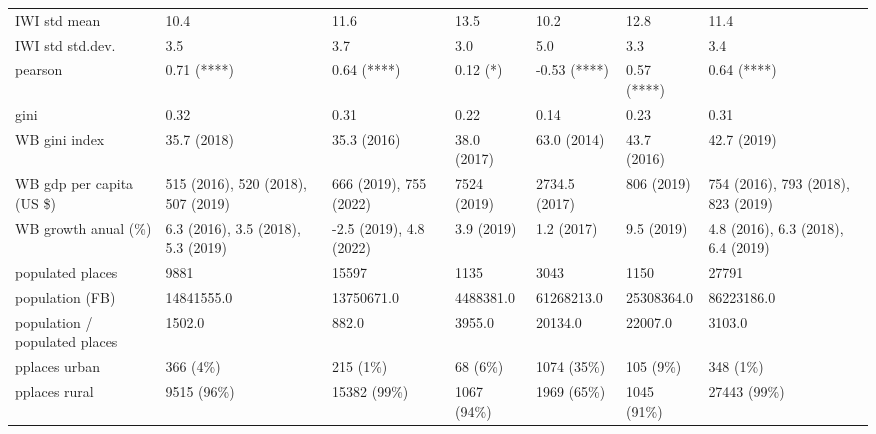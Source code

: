 \begin{tabular}{lllllll}
IWI std mean                  &                                10.4 &                     11.6 &         13.5 &           10.2 &         12.8 &                                11.4 \\
IWI std std.dev.              &                                 3.5 &                      3.7 &          3.0 &            5.0 &          3.3 &                                 3.4 \\
pearson                       &                         0.71 (****) &              0.64 (****) &     0.12 (*) &   -0.53 (****) &  0.57 (****) &                         0.64 (****) \\
gini                          &                                0.32 &                     0.31 &         0.22 &           0.14 &         0.23 &                                0.31 \\
WB gini index                 &                         35.7 (2018) &              35.3 (2016) &  38.0 (2017) &    63.0 (2014) &  43.7 (2016) &                         42.7 (2019) \\
WB gdp per capita (US \$)      &  515 (2016), 520 (2018), 507 (2019) &   666 (2019), 755 (2022) &  7524 (2019) &  2734.5 (2017) &   806 (2019) &  754 (2016), 793 (2018), 823 (2019) \\
WB growth anual (\%)           &  6.3 (2016), 3.5 (2018), 5.3 (2019) &  -2.5 (2019), 4.8 (2022) &   3.9 (2019) &     1.2 (2017) &   9.5 (2019) &  4.8 (2016), 6.3 (2018), 6.4 (2019) \\
populated places              &                                9881 &                    15597 &         1135 &           3043 &         1150 &                               27791 \\
population (FB)               &                          14841555.0 &               13750671.0 &    4488381.0 &     61268213.0 &   25308364.0 &                          86223186.0 \\
population / populated places &                              1502.0 &                    882.0 &       3955.0 &        20134.0 &      22007.0 &                              3103.0 \\
pplaces urban                 &                            366 (4\%) &                 215 (1\%) &      68 (6\%) &     1074 (35\%) &     105 (9\%) &                            348 (1\%) \\
pplaces rural                 &                          9515 (96\%) &              15382 (99\%) &   1067 (94\%) &     1969 (65\%) &   1045 (91\%) &                         27443 (99\%) \\

\end{tabular}
